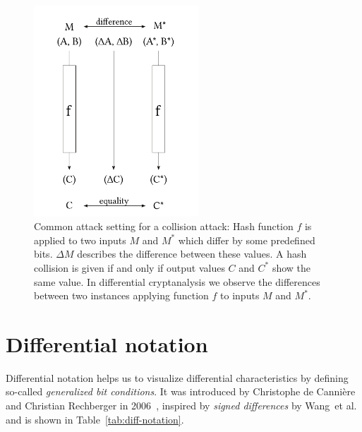 \begin{figure}[bt]
  \begin{center}
    \includegraphics[width=0.55\textwidth]{img/diff_cryptanalysis.pdf}
    \caption[Common attack setting for a collision attack]{
      Common attack setting for a collision attack:
      Hash function $f$ is applied to two inputs $M$ and $M^*$ which differ
      by some predefined bits. $\Delta M$ describes the difference between
      these values. A hash collision is given if and only if output values
      $C$ and $C^*$ show the same value. In differential cryptanalysis we observe
      the differences between two instances applying function $f$
      to inputs $M$ and $M^*$.
    }
    \label{tab:collision-attack}
  \end{center}
\end{figure}

\section{Differential notation}
\label{sec:dc-notation}
%
Differential notation helps us to visualize differential characteristics
by defining so-called \emph{generalized bit conditions}.
It was introduced by Christophe de Canni\`ere and Christian Rechberger
in 2006~\cite[Section 3.2]{char-2006}, inspired by \emph{signed differences} by
Wang~et al. and is shown in Table~\ref{tab:diff-notation}.

